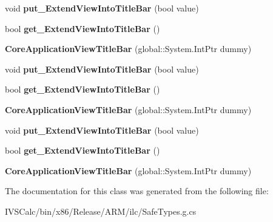\begin{DoxyCompactItemize}
void {\bfseries put\+\_\+\+Extend\+View\+Into\+Title\+Bar} (bool value)
\item 
\mbox{\label{class_windows_1_1_application_model_1_1_core_1_1_core_application_view_title_bar_a5919a91fb12baad08d49779e81a6cfda}} 
bool {\bfseries get\+\_\+\+Extend\+View\+Into\+Title\+Bar} ()
\item 
\mbox{\label{class_windows_1_1_application_model_1_1_core_1_1_core_application_view_title_bar_aeffec68503256994090afe001565e849}} 
{\bfseries Core\+Application\+View\+Title\+Bar} (global\+::\+System.\+Int\+Ptr dummy)
\item 
\mbox{\label{class_windows_1_1_application_model_1_1_core_1_1_core_application_view_title_bar_a0deb838e7b507c1d3275c524a4542808}} 
void {\bfseries put\+\_\+\+Extend\+View\+Into\+Title\+Bar} (bool value)
\item 
\mbox{\label{class_windows_1_1_application_model_1_1_core_1_1_core_application_view_title_bar_a5919a91fb12baad08d49779e81a6cfda}} 
bool {\bfseries get\+\_\+\+Extend\+View\+Into\+Title\+Bar} ()
\item 
\mbox{\label{class_windows_1_1_application_model_1_1_core_1_1_core_application_view_title_bar_aeffec68503256994090afe001565e849}} 
{\bfseries Core\+Application\+View\+Title\+Bar} (global\+::\+System.\+Int\+Ptr dummy)
\item 
\mbox{\label{class_windows_1_1_application_model_1_1_core_1_1_core_application_view_title_bar_a0deb838e7b507c1d3275c524a4542808}} 
void {\bfseries put\+\_\+\+Extend\+View\+Into\+Title\+Bar} (bool value)
\item 
\mbox{\label{class_windows_1_1_application_model_1_1_core_1_1_core_application_view_title_bar_a5919a91fb12baad08d49779e81a6cfda}} 
bool {\bfseries get\+\_\+\+Extend\+View\+Into\+Title\+Bar} ()
\item 
\mbox{\label{class_windows_1_1_application_model_1_1_core_1_1_core_application_view_title_bar_aeffec68503256994090afe001565e849}} 
{\bfseries Core\+Application\+View\+Title\+Bar} (global\+::\+System.\+Int\+Ptr dummy)
\end{DoxyCompactItemize}


The documentation for this class was generated from the following file\+:\begin{DoxyCompactItemize}
\item 
I\+V\+S\+Calc/bin/x86/\+Release/\+A\+R\+M/ilc/Safe\+Types.\+g.\+cs\end{DoxyCompactItemize}
